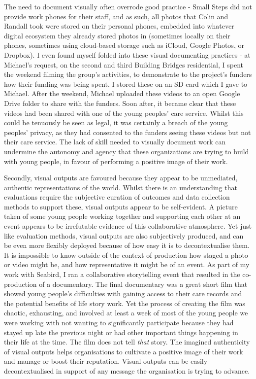 The need to document visually often overrode good practice - Small Steps did not provide work phones for their staff, and as such, all photos that Colin and Randall took were stored on their personal phones, embedded into whatever digital ecosystem they already stored photos in (sometimes locally on their phones, sometimes using cloud-based storage such as iCloud, Google Photos, or Dropbox). I even found myself folded into these visual documenting practices -  at Michael's request, on the second and third Building Bridges residential, I spent the weekend filming the group's activities, to demonstrate to the project's funders how their funding was being spent. I stored these on an SD card which I gave to Michael. After the weekend, Michael uploaded these videos to an open Google Drive folder to share with the funders. Soon after, it became clear that these videos had been shared with one of the young peoples’ care service. Whilst this could be tenuously be seen as legal, it was certainly a breach of the young peoples’ privacy, as they had consented to the funders seeing these videos but not their care service. The lack of skill needed to visually document work can undermine the autonomy and agency that these organizations are trying to build with young people, in favour of performing a positive image of their work. 

Secondly, visual outputs are favoured because they appear to be unmediated, authentic representations of the world. Whilst there is an understanding that evaluations require the subjective curation of outcomes and data collection methods to support these, visual outputs appear to be self-evident. A picture taken of some young people working together and supporting each other at an event appears to be irrefutable evidence of this collaborative atmosphere. Yet just like evaluation methods, visual outputs are also subjectively produced, and can be even more flexibly deployed because of how easy it is to decontextualise them. It is impossible to know outside of the context of production how staged a photo or video might be, and how representative it might be of an event. As part of my work with Seabird, I ran a collaborative storytelling event that resulted in the co-production of a documentary. The final documentary was a great short film that showed young people's difficulties with gaining access to their care records and the potential benefits of life story work. Yet the process of creating the film was chaotic, exhausting, and involved at least a week of most of the young people we were working with not wanting to significantly participate because they had stayed up late the previous night or had other important things happening in their life at the time. The film does not tell \emph{that} story. The imagined authenticity of visual outputs helps organisations to cultivate a positive image of their work and manage or boost their reputation. Visual outputs can be easily decontextualised in support of any message the organisation is trying to advance.

